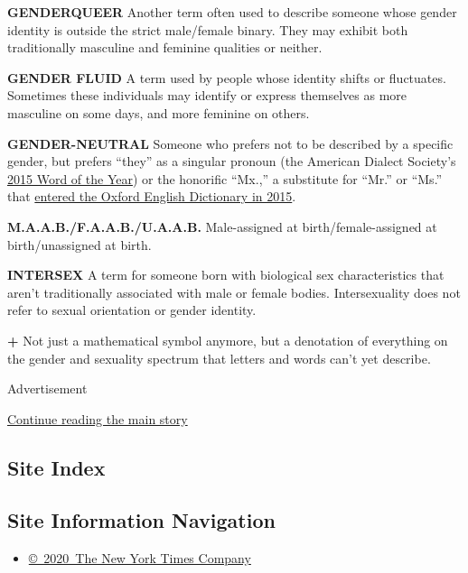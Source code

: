 \textbf{GENDERQUEER} Another term often used to describe someone whose
gender identity is outside the strict male/female binary. They may
exhibit both traditionally masculine and feminine qualities or neither.

\textbf{GENDER FLUID} A term used by people whose identity shifts or
fluctuates. Sometimes these individuals may identify or express
themselves as more masculine on some days, and more feminine on others.

\textbf{GENDER-NEUTRAL} Someone who prefers not to be described by a
specific gender, but prefers ``they'' as a singular pronoun (the
American Dialect Society's
\href{https://www.nytimes3xbfgragh.onion/2016/01/31/fashion/pronoun-confusion-sexual-fluidity.html}{2015
Word of the Year}) or the honorific ``Mx.,'' a substitute for ``Mr.'' or
``Ms.'' that
\href{https://www.nytimes3xbfgragh.onion/2015/06/07/style/me-myself-and-mx.html}{entered
the Oxford English Dictionary in 2015}.

\textbf{M.A.A.B./F.A.A.B./U.A.A.B.} Male-assigned at
birth/female-assigned at birth/unassigned at birth.

\textbf{INTERSEX} A term for someone born with biological sex
characteristics that aren't traditionally associated with male or female
bodies. Intersexuality does not refer to sexual orientation or gender
identity.

\textbf{+} Not just a mathematical symbol anymore, but a denotation of
everything on the gender and sexuality spectrum that letters and words
can't yet describe.

Advertisement

\protect\hyperlink{after-bottom}{Continue reading the main story}

\hypertarget{site-index}{%
\subsection{Site Index}\label{site-index}}

\hypertarget{site-information-navigation}{%
\subsection{Site Information
Navigation}\label{site-information-navigation}}

\begin{itemize}
\tightlist
\item
  \href{https://help.nytimes3xbfgragh.onion/hc/en-us/articles/115014792127-Copyright-notice}{©~2020~The
  New York Times Company}
\end{itemize}

